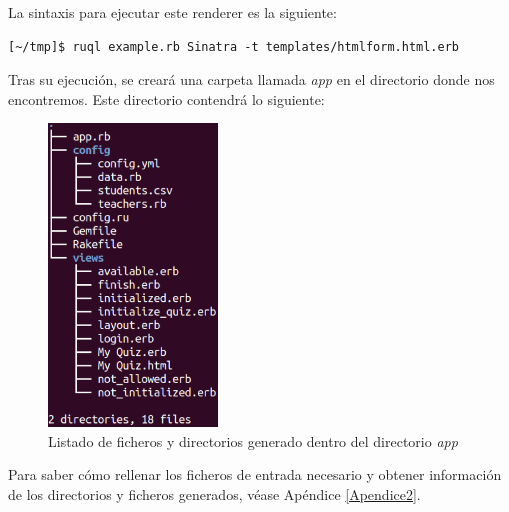 La sintaxis para ejecutar este renderer es la siguiente:
\begin{verbatim}
[~/tmp]$ ruql example.rb Sinatra -t templates/htmlform.html.erb
\end{verbatim}

Tras su ejecuci\'on, se crear\'a una carpeta llamada \textit{app} en el directorio donde nos encontremos. Este directorio contendr\'a lo siguiente:
\begin{figure}[!th]
\begin{center}
\includegraphics[width=0.4\textwidth]{images/app.eps}
\caption{Listado de ficheros y directorios generado dentro del directorio \textit{app}}
\label{fig:app}
\end{center}
\end{figure}
  
Para saber c\'omo rellenar los ficheros de entrada necesario y obtener informaci\'on de los directorios y ficheros generados, v\'ease Ap\'endice \ref{Apendice2}.
\bigskip
\bigskip
\bigskip

